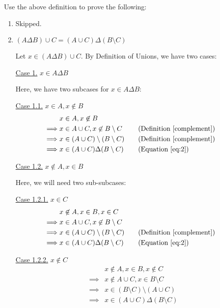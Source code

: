 \bp Use the above definition to prove the following:
\begin{enumerate}
	\item Skipped.

	\item $(A \Delta B) \cup C = (A \cup C) \Delta (B \setminus C)$

	      \bs
	      \begin{named}[Part 1]
		      Let $x \in (A \Delta B) \cup C$. By Definition of Unions, we have two cases:

		      \underline{Case 1.} $x \in A \Delta B$

		      Here, we have two subcases for $x \in A \Delta B$:

		      \underline{Case 1.1.} $x \in A, x \not\in B$
		      \begin{align*}
			               & x \in A, x \not\in B \\
			      \implies & x \in A \cup C, x \not\in B \setminus C
							&& \quad \text{(Definition \ref{complement})} \\
			      \implies & x \in (A \cup C) \setminus (B \setminus C)
							&& \quad \text{(Definition \ref{complement})} \\
			      \implies & x \in (A \cup C) \Delta (B \setminus C)
							&& \quad \text{(Equation \ref{eq:2})}
		      \end{align*}

		      \underline{Case 1.2.} $x \not\in A, x \in B$

					Here, we will need two sub-subcases:

					\underline{Case 1.2.1.} $x \in C$
		      \begin{align*}
			               & x \not\in A, x \in B, x \in C \\
			      \implies & x \in A \cup C, x \not\in B \setminus C    \\
			      \implies & x \in (A \cup C) \setminus (B \setminus C)
							&& \quad \text{(Definition \ref{complement})} \\
			      \implies & x \in (A \cup C) \Delta (B \setminus C)
							&& \quad \text{(Equation \ref{eq:2})}
		      \end{align*}

					\underline{Case 1.2.2.} $x \not\in C$
		      \begin{align*}
			               & x \not\in A, x \in B, x \not\in C \\
			      \implies & x \not\in A \cup C, x \in B \setminus C    \\
			      \implies & x \in (B \setminus C) \setminus (A \cup C) \\
			      \implies & x \in (A \cup C) \Delta (B \setminus C)
		      \end{align*}



\end{named}
\end{enumerate}
